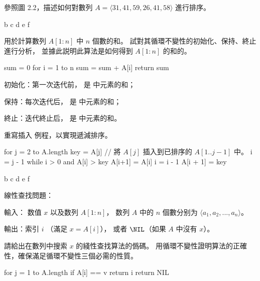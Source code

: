 \startsection[
  title={Insertion sort},,
  reference=section:insersion_sort,
]

\startEXERCISE
參照圖 2.2，描述如何對數列 $A = \langle 31, 41, 59, 26, 41, 58\rangle$ 進行排序。
\stopEXERCISE

\startANSWER
{}
{\externalfigure[output/e2_1_1-2]}{b}
{\externalfigure[output/e2_1_1-3]}{c}
{\externalfigure[output/e2_1_1-4]}{d}
{\externalfigure[output/e2_1_1-5]}{e}
{\externalfigure[output/e2_1_1-6]}{f}
\stopcombination
\stopANSWER

\startEXERCISE
{} 用於計算數列 $A[1:n]$ 中 $n$ 個數的和。
試對其循環不變性的初始化、保持、終止進行分析，
並據此説明此算法是如何得到 $A[1:n]$ 的和的。

\startCLRSCODE
sum = 0
for i = 1 to n
	sum = sum + A[i]
return sum
\stopCLRSCODE
\stopEXERCISE

\startANSWER
\startigBase
\item 初始化：第一次迭代前，  是  中元素的和；
\item 保持：每次迭代后，  是  中元素的和；
\item 終止：迭代終止后，  是  中元素的和。
\stopigBase
\stopANSWER

\startEXERCISE
重寫插入 例程，以實現遞減排序。
\stopEXERCISE
\startANSWER

\startCLRSCODE
for j = 2 to A.length
	key = A[j]
	// 將 $A[j]$ 插入到已排序的 $A[1 .. j-1]$ 中。
	i = j - 1
	while i > 0 and A[i] > key
		A[i+1] = A[i]
		i = i - 1
	A[i + 1] = key
\stopCLRSCODE

{\externalfigure[output/e2_1_2-2]}{b}
{\externalfigure[output/e2_1_2-3]}{c}
{\externalfigure[output/e2_1_2-4]}{d}
{\externalfigure[output/e2_1_2-5]}{e}
{\externalfigure[output/e2_1_2-6]}{f}
\stopcombination
\stopANSWER

線性查找問題：

輸入： 数值 $x$ 以及数列 $A[1:n]$，
数列 $A$ 中的 $n$ 個數分别为 $\langle a_1, a_2, ..., a_n \rangle$。

輸出：索引 $i$ （滿足 $x = A[i]$），
或者 $\NIL$（如果 $A$ 中沒有 $x$）。

請給出在數列中搜索 $x$ 的綫性查找算法的僞碼。
用循環不變性證明算法的正確性，確保滿足循環不變性三個必需的性質。
\stopEXERCISE

\startANSWER
\startCLRSCODE
for j = 1 to A.length
	if A[i] == v
		return i
return NIL
\stopCLRSCODE
\stopANSWER

